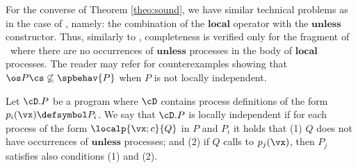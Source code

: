 \documentclass{tlp}
\begin{document}
 For the converse of Theorem \ref{theo:sound}, we have similar technical problems as in the case of \tccp,  namely: the combination of the $\mathbf{local}$ operator with the $\mathbf{unless}$ constructor.  Thus, similarly to \tccp, completeness is verified only for the  fragment of \utcc\ where there are no occurrences of $\mathbf{unless}$ processes in the body of $\mathbf{local}$ processes. The reader may refer \cite{BoerPP95,NPV02} for  counterexamples showing that  $\os P\cs \not\subseteq \spbehav{P}$ when $P$ is not locally independent. 

 \begin{definition} \label{def:LI}
Let $\cD.P$ be a program where $\cD$ contains process definitions of the form $p_i(\vx) \defsymbol P_i$.
We say that $\cD.P$ is 
 locally independent if for each process of the form $\localp{\vx;c}{Q}$ in $P$ and $P_i$  it holds that 
(1)  $Q$ does not have occurrences of $\mathbf{unless}$ processes; and (2) if $Q$ calls to $p_j(\vx)$, then $P_j$ satisfies also conditions (1) and (2).
\end{definition}
\end{document}
